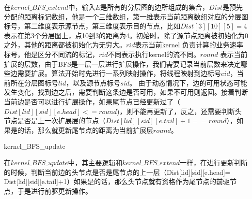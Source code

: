 在$kernel\_BFS\_extend$中，输入$E$是所有的分层图的边所组成的集合，$Dist$是预先分配的距离标记数组，他是一个三维数组，第一维表示当前距离数组对应的分层图标号，第二维度表示源节点，第三维度表示目的节点，比如$Dist[3][10][5]=4$表示在第3个分层图上，点10到3的距离为4。初始时，除了源节点距离被初始化为0之外，其他的距离都被初始化为无穷大。$rid$表示当前kernel 负责计算的业务速率标号，他是区分不同流的标记，$rid$不同表示执行kernel的流不同。$round$ 表示当前扩展的层数，由于BFS是一层一层进行扩展操作，我们需要记录当前层数来决定哪些边需要扩展。算法开始时先进行一系列映射操作，将线程映射到边标号$eid$，当前所在分层图标号$lid$，以及源节点标号$sid$。 由于动态情况下，边的可用状态可能发生变化，找到边之后，需要判断这条边是否可用，如果不可用则返回。接着判断当前边是否可以进行扩展操作，如果尾节点已经更新过了（$Dist[lid][sid][e.head]<=round$)，则不能再更新了，反之，还需要判断头节点是否是上一次扩展层的节点（$Dist[lid][sid][e.tail]+1==round$），如果是的话，那么就更新尾节点的距离为当前扩展层$round$。
\begin{algorithm}[t]
\begin{algorithmic}[1]
\EndIf
{}
\EndIf
\EndFunction
\end{algorithmic}
\caption{kernel\_BFS\_update}
\label{KernelBFS}
\end{algorithm}

在$kernel\_BFS\_update$中，其主要逻辑和$kernel\_BFS\_extend$一样，在进行更新判断的时候，判断当前边的头节点是否是尾节点的上一层（Dist[lid][sid][e.head]= Dist[lid][sid][e.tail]+1）如果是的话，那么头节点就有资格作为尾节点的前驱节点，于是进行前驱更新操作。

